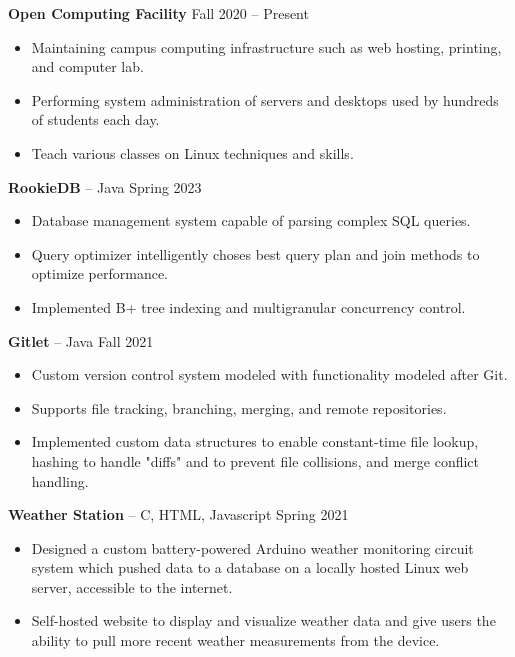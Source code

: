 \documentclass{article}
\begin{document}
    \textbf{Open Computing Facility} \hfill Fall 2020 -- Present
    \begin{itemize}
        \item Maintaining campus computing infrastructure such as web hosting, printing, and computer lab.
        \item Performing system administration of servers and desktops used by hundreds of students each day.
        \item Teach various classes on Linux techniques and skills.
    \end{itemize}


    \textbf{RookieDB} -- Java \hfill Spring 2023
    \begin{itemize}
        \item Database management system capable of parsing complex SQL queries.
        \item Query optimizer intelligently choses best query plan and join methods to optimize performance.
        \item Implemented B+ tree indexing and multigranular concurrency control. 
    \end{itemize}

    \vspace{1mm}

    \textbf{Gitlet} -- Java \hfill Fall 2021 
    \begin{itemize}
        \item Custom version control system modeled with functionality modeled after Git.
        \item Supports file tracking, branching, merging, and remote repositories.
        \item Implemented custom data structures to enable constant-time file lookup, hashing to handle "diffs" and to prevent file collisions, and merge conflict handling.
    \end{itemize}

    \vspace{1mm}

    \noindent \textbf{Weather Station} -- C, HTML, Javascript \hfill Spring 2021
    \begin{itemize}
        \item Designed a custom battery-powered Arduino weather monitoring circuit system which pushed data to a database on a locally hosted Linux web server, accessible to the internet. 
        \item Self-hosted website to display and visualize weather data and give users the ability to pull more recent weather measurements from the device.
    \end{itemize}
\end{document}
